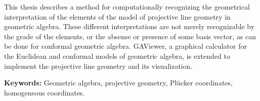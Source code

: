 This thesis describes a method for computationally recognizing the geometrical interpretation of the elements of the model of projective line geometry in geometric algebra.  These different interpretations are not merely recognizable by the grade of the elements, or the absense or presence of some basis vector, as can be done for conformal geometric algebra.  GAViewer, a graphical calculator for the Euclidean and conformal models of geometric algebra, is extended to implement the projective line geometry and its visualization.

\textbf{Keywords:} Geometric algebra, projective geometry, Pl\"ucker coordinates, homogeneous coordinates.


